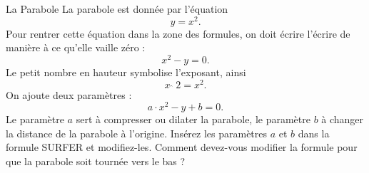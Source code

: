 \begin{surferPage}[Parabole]{La Parabole}
La parabole est donnée par l'équation \[y=x^2.\]
Pour rentrer cette équation dans la zone des formules, on doit écrire l'écrire de manière à ce qu'elle vaille zéro :
\[x^2-y=0 .\]
Le petit nombre en hauteur symbolise l'exposant, ainsi
\[ x  \,\hat{\ } \, 2 =x^2.\]
On ajoute deux paramètres :
\[a \cdot x^2-y+b=0.\]
Le paramètre $a$ sert à compresser ou dilater la parabole, le paramètre $b$ à changer la distance de la parabole à l'origine.
\newline
Insérez les paramètres $a$ et $b$ dans la formule SURFER et modifiez-les. Comment devez-vous modifier la formule pour que la parabole soit tournée vers le bas ?
\end{surferPage}
